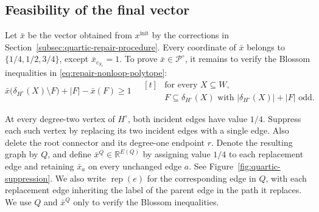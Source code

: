\documentclass[11pt]{amsart}
\newcommand{\rep}[1]{\operatorname{rep}(#1)}
\newcommand{\1}{\mathbbm{1}}
\begin{document}
\subsection{Feasibility of the final vector}
\label{subsec:quartic-feasibility}

Let $\bar x$ be the vector obtained from $x^{\mathrm{init}}$
by the corrections in
Section~\ref{subsec:quartic-repair-procedure}.
Every coordinate of $\bar x$ belongs to $\{1/4,1/2,3/4\}$,
except $\bar x_{c_{S_r}}=1$. To prove
$\bar x\in{\mathcal P^\circ}$, it remains to verify the
Blossom inequalities in
\eqref{eq:repair-nonloop-polytope}:
\begin{equation}
\label{eq:quartic-cut-goal}
 \bar x\bigl(\delta_{H^\circ}(X)\setminus F\bigr)+|F|-\bar x(F)\ge1
 \quad\begin{aligned}[t]
 &\text{for every }X\subseteq W,\\
 &F\subseteq\delta_{H^\circ}(X)
   \text{ with }|\delta_{H^\circ}(X)|+|F|\text{ odd}.
 \end{aligned}
\end{equation}

At every degree-two vertex of $H^\circ$, both incident
edges have value $1/4$. Suppress each such vertex by
replacing its two incident edges with a single edge.
Also delete the root connector and its degree-one endpoint
$r$. Denote the resulting graph by $Q$, and define
$\bar x^Q\in\mathbb R^{E(Q)}$ by assigning value $1/4$ to each
replacement edge and retaining $\bar x_a$ on every unchanged
edge $a$. See Figure~\ref{fig:quartic-suppression}.
We also write $\rep{e}$ for the corresponding edge in $Q$, with
each replacement edge inheriting the label of the parent edge
in the path it replaces.
We use $Q$ and $\bar x^Q$ only to verify the Blossom inequalities.
\end{document}
